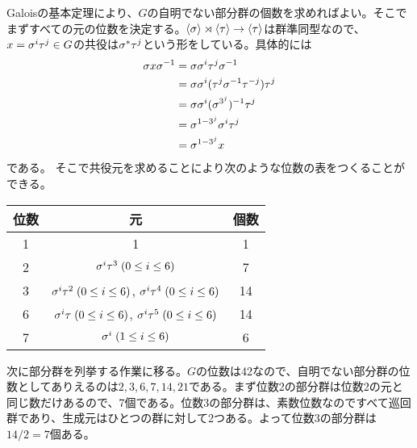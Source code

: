 \begin{sol}
\begin{description}
  Galoisの基本定理により、$G$の自明でない部分群の個数を求めればよい。そこでまずすべての元の位数を決定する。$\langle {\sigma} \rangle \rtimes \langle \tau \rangle \to \langle \tau \rangle$は群準同型なので、$x = {\sigma}^i \tau^j \in G$の共役は${\sigma}^{*} \tau^j$という形をしている。具体的には
    \begin{align*}
      {\sigma} x {\sigma}^{-1} &= {\sigma} {\sigma}^i \tau^j {\sigma}^{-1} \\
      &= {\sigma} {\sigma}^i (\tau^j {\sigma}^{-1} \tau^{-j} ) \tau^j \\
      &= {\sigma} {\sigma}^i ({\sigma}^{3^j})^{-1} \tau^j \\
      &= {\sigma}^{1 - 3^j} {\sigma}^i \tau^j \\
      &= {\sigma}^{1 - 3^j} x
    \end{align*}
    である。
  そこで共役元を求めることにより次のような位数の表をつくることができる。
  \begin{center}
  \begin{tabular}{ccc}
   \hline
位数 & 元 & 個数 \\
   \hline \hline
   1 & 1 & 1 \\
   2 & ${\sigma}^i \tau^3 \; (0 \leq i \leq 6)$ &  7 \\
  3 & ${\sigma}^i \tau^2 \; (0 \leq i \leq 6)$, ${\sigma}^i \tau^4 \; (0 \leq i \leq 6)$ &  14  \\
  6 & ${\sigma}^i \tau \; (0 \leq i \leq 6)$, ${\sigma}^i \tau^5 \; (0 \leq i \leq 6)$ & 14 \\
  7 & ${\sigma}^i \; ( 1 \leq i \leq 6)$ & 6
   \end{tabular}
  \end{center}
  次に部分群を列挙する作業に移る。$G$の位数は42なので、自明でない部分群の位数としてありえるのは$2,3,6,7,14,21$である。まず位数2の部分群は位数2の元と同じ数だけあるので、7個である。位数3の部分群は、素数位数なのですべて巡回群であり、生成元はひとつの群に対して2つある。よって位数3の部分群は$14/2 = 7$個ある。


\end{description}
\end{sol}
